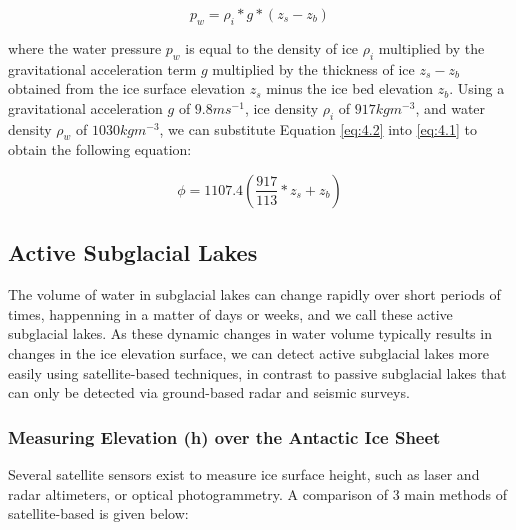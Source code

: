 \begin{equation}\label{eq:4.2}
  p_w = \rho_i * g * (z_s - z_b)
\end{equation}

where the water pressure $p_w$ is equal to the density of ice $\rho_i$ multiplied by the gravitational acceleration term $g$ multiplied by the thickness of ice $z_s - z_b$ obtained from the ice surface elevation $z_s$ minus the ice bed elevation $z_b$.
Using a gravitational acceleration $g$ of $9.8ms^{-1}$, ice density $\rho_i$ of $917kgm^{-3}$, and water density $\rho_w$ of $1030kgm^{-3}$, we can substitute Equation \eqref{eq:4.2} into \eqref{eq:4.1} to obtain the following equation:

\begin{equation}\label{eq:4.3}
  \phi = 1107.4\left(\frac{917}{113} * z_s + z_b \right)
\end{equation}


\subsection{Active Subglacial Lakes}

The volume of water in subglacial lakes can change rapidly over short periods of times, happenning in a matter of days or weeks, and we call these active subglacial lakes.
As these dynamic changes in water volume typically results in changes in the ice elevation surface, we can detect active subglacial lakes more easily using satellite-based techniques, in contrast to passive subglacial lakes that can only be detected via ground-based radar and seismic surveys.


\subsubsection{Measuring Elevation (h) over the Antactic Ice Sheet}

Several satellite sensors exist to measure ice surface height, such as laser and radar altimeters, or optical photogrammetry.
A comparison of 3 main methods of satellite-based is given below:

